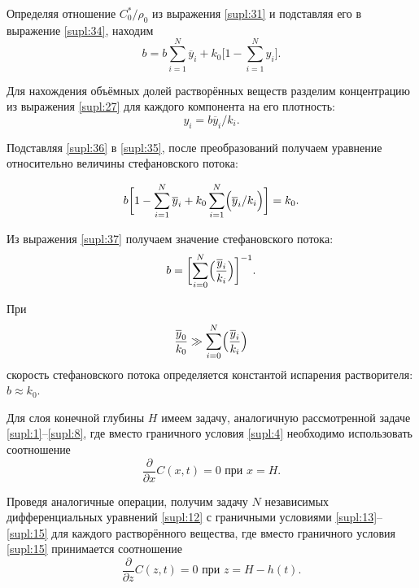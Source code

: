 Определяя отношение  $C_0^*/\rho_0$ из выражения \eqref{supl:31} и подставляя его в выражение \eqref{supl:34}, находим
\begin{equation} %
\label{supl:35}
b=b \sum \limits_{i=1}^{N} \overline{y}_i  + k_0 \biggl [1- \sum \limits_{i=1}^{N} y_i \biggr].
\end{equation}

Для нахождения объёмных долей растворённых веществ разделим концентрацию из выражения \eqref{supl:27} для каждого компонента на его плотность:
\begin{equation}%
\label{supl:36}
y_i = b \overline{y}_i / k_i.
\end{equation}

Подставляя \eqref{supl:36}  в \eqref{supl:35}, после преобразований получаем уравнение относительно величины стефановского потока:

\begin{equation}%
\label{supl:37}
b \biggl [ 1- \sum \limits_{i=1}^{N}\overline{y}_i+k_0 \sum \limits_{i=1}^{N} \Bigl( \overline{y}_i/k_i \Bigr) \biggr]= k_0 .
\end{equation}

Из выражения \eqref{supl:37} получаем значение стефановского потока:
\begin{equation}%
\label{supl:38}
b = \biggl [\sum \limits_{i=0}^{N} \Bigl(\frac{\overline{y}_i}{k_i} \Bigr)  \biggr]^{-1}.
\end{equation}

При $$\frac{\overline{y}_0}{k_0}\gg \sum \limits_{i=0}^{N} \Bigl(\frac{\overline{y}_i}{k_i} \Bigr)$$  скорость стефановского потока определяется константой испарения растворителя:
$
b \approx k_0.
$

Для слоя конечной глубины $H$ имеем задачу, аналогичную рассмотренной задаче \eqref{supl:1}--\eqref{supl:8}, где вместо граничного условия \eqref{supl:4} необходимо использовать соотношение
\begin{equation}%
\label{supl:40}
\frac{\partial}{\partial x} C(x,t) = 0 \text{ при } x = H.
\end{equation}

Проведя аналогичные операции, получим задачу $N$ независимых дифференциальных уравнений \eqref{supl:12} с граничными условиями \eqref{supl:13}--\eqref{supl:15} для каждого растворённого вещества, где вместо граничного условия \eqref{supl:15} принимается соотношение
\begin{equation}%
\label{supl:41}
\frac{\partial}{\partial z} C(z,t) = 0 \text{ при } z = H - h(t).
\end{equation}

